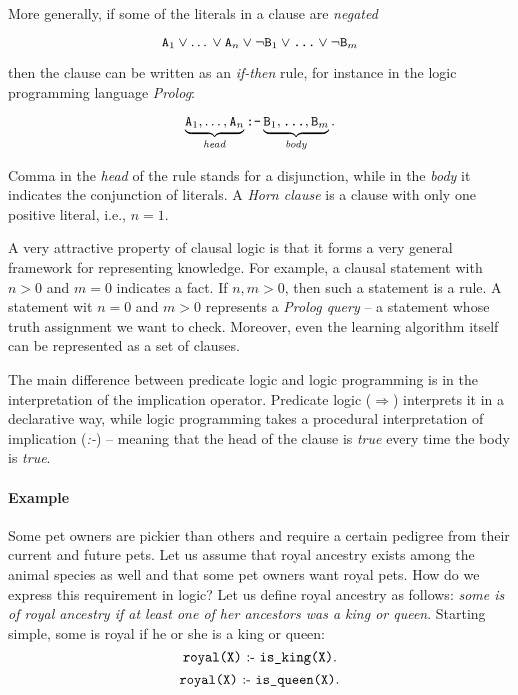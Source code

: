 More generally, if some of the literals in a clause are \textit{negated}

$$ \text{\texttt{A}}_1 \vee \text{\ldots} \vee \text{\texttt{A}}_n \vee \neg \text{\texttt{B}}_1 \vee \text{\texttt{\ldots}} \vee \neg \text{\texttt{B}}_m$$

then the clause can be written as an \textit{if-then} rule, for instance in the logic programming language \textit{Prolog}:

$$ \underbrace{\text{\texttt{A}}_1, \text{\ldots}, \text{\texttt{A}}_n}_{\text{\textit{head}}} \text{\texttt{:-}} \underbrace{\text{\texttt{B}}_1, \text{\texttt{\ldots}}, \text{\texttt{B}}_m}_{\text{\textit{body}}}.$$

Comma in the \textit{head} of the rule stands for a disjunction, while in the \textit{body} it indicates the conjunction of literals.
A \textit{Horn clause} is a clause with only one positive literal, i.e., $n = 1$.



A very attractive property of clausal logic is that it forms a very general framework for representing knowledge.
For example, a clausal statement with $n > 0$ and $m = 0$ indicates a fact.
If $n, m > 0$, then such a statement is a rule.
A statement wit $n=0$ and $m > 0$ represents a \textit{Prolog query} -- a statement whose truth assignment we want to check.
Moreover, even the learning algorithm itself can be represented as a set of clauses.



The main difference between predicate logic and logic programming is in the interpretation of the implication operator.
Predicate logic ($\Rightarrow$) interprets it in a declarative way, while logic programming takes a procedural interpretation of implication (\textit{:-}) -- meaning that the head of the clause is \textit{true} every time the body is \textit{true}.



\paragraph{Example}
Some pet owners are pickier than others and require a certain pedigree from their current and future pets.
Let us assume that royal ancestry exists among the animal species as well and that some pet owners want royal pets.
How do we express this requirement in logic?
Let us define royal ancestry as follows: \textit{some is of royal ancestry if at least one of her ancestors was a king or queen}.
Starting simple, some is royal if he or she is a king or queen:
$$ \text{\texttt{royal(X)}} \text{ :- } \text{\texttt{is\_king(X)}}.$$
$$ \text{\texttt{royal(X)}} \text{ :- } \text{\texttt{is\_queen(X)}}.$$

